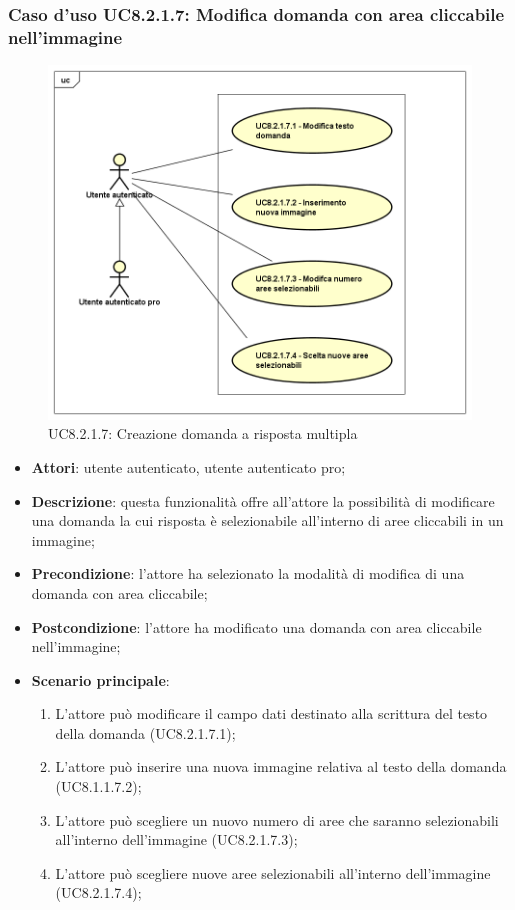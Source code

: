 \subsubsection{Caso d'uso UC8.2.1.7: Modifica domanda con area cliccabile nell'immagine}
\label{UC8.2.1.7}
\begin{figure}[h]
	\centering
	\includegraphics[scale=0.5,keepaspectratio]{UML/UC8_2_1_7.png}
	\caption{UC8.2.1.7: Creazione domanda a risposta multipla}
\end{figure}
\FloatBarrier
\begin{itemize}
	\item \textbf{Attori}: utente autenticato, utente autenticato pro;
	\item \textbf{Descrizione}: questa funzionalità offre all'attore la possibilità di modificare una domanda la cui risposta è selezionabile all'interno di aree cliccabili in un immagine;
	\item \textbf{Precondizione}: l'attore ha selezionato la modalità di modifica di una domanda con area cliccabile; 
	\item \textbf{Postcondizione}: l'attore ha modificato una domanda con area cliccabile nell'immagine;
	\item \textbf{Scenario principale}:
		\begin{enumerate}
	       	\item L'attore può modificare il campo dati destinato alla scrittura del testo della domanda (UC8.2.1.7.1);
	        \item L'attore può inserire una nuova immagine relativa al testo della domanda (UC8.1.1.7.2);
			\item L'attore può scegliere un nuovo numero di aree che saranno selezionabili all'interno dell'immagine (UC8.2.1.7.3);
			\item L'attore può scegliere nuove aree selezionabili all'interno dell'immagine (UC8.2.1.7.4);
	 	\end{enumerate}
\end{itemize}

